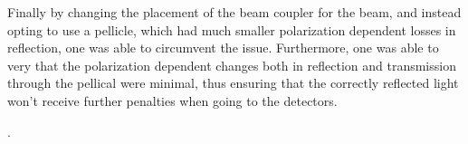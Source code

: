 Finally by changing the placement of the beam coupler for the beam, and instead opting to use a pellicle, which had much smaller polarization dependent losses in reflection, one was able to circumvent the issue. Furthermore, one was able to very that the polarization dependent changes both in reflection and transmission through the pellical were minimal, thus ensuring that the correctly reflected light won't receive further penalties when going to the detectors.

.
